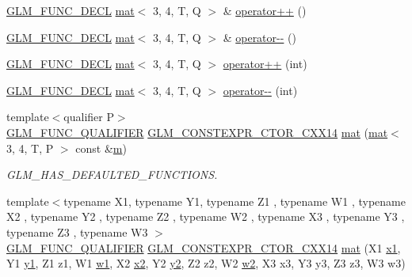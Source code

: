 \begin{DoxyCompactItemize}
\item 
\hyperlink{setup_8hpp_ab2d052de21a70539923e9bcbf6e83a51}{G\+L\+M\+\_\+\+F\+U\+N\+C\+\_\+\+D\+E\+CL} \hyperlink{structglm_1_1mat}{mat}$<$ 3, 4, T, Q $>$ \& \hyperlink{structglm_1_1mat_3_013_00_014_00_01_t_00_01_q_01_4_a03979bbfa60bbc49190ce6fd347ca6ee}{operator++} ()
\item 
\hyperlink{setup_8hpp_ab2d052de21a70539923e9bcbf6e83a51}{G\+L\+M\+\_\+\+F\+U\+N\+C\+\_\+\+D\+E\+CL} \hyperlink{structglm_1_1mat}{mat}$<$ 3, 4, T, Q $>$ \& \hyperlink{structglm_1_1mat_3_013_00_014_00_01_t_00_01_q_01_4_a127c5f4434bbd959b577ae5dfd808c10}{operator-\/-\/} ()
\item 
\hyperlink{setup_8hpp_ab2d052de21a70539923e9bcbf6e83a51}{G\+L\+M\+\_\+\+F\+U\+N\+C\+\_\+\+D\+E\+CL} \hyperlink{structglm_1_1mat}{mat}$<$ 3, 4, T, Q $>$ \hyperlink{structglm_1_1mat_3_013_00_014_00_01_t_00_01_q_01_4_ad8fc281f2fb4cd5fd107f4c4a1a04be8}{operator++} (int)
\item 
\hyperlink{setup_8hpp_ab2d052de21a70539923e9bcbf6e83a51}{G\+L\+M\+\_\+\+F\+U\+N\+C\+\_\+\+D\+E\+CL} \hyperlink{structglm_1_1mat}{mat}$<$ 3, 4, T, Q $>$ \hyperlink{structglm_1_1mat_3_013_00_014_00_01_t_00_01_q_01_4_a61b4e82bca6ca608b52da28a1ea5333a}{operator-\/-\/} (int)
\item 
{\footnotesize template$<$qualifier P$>$ }\\\hyperlink{setup_8hpp_a33fdea6f91c5f834105f7415e2a64407}{G\+L\+M\+\_\+\+F\+U\+N\+C\+\_\+\+Q\+U\+A\+L\+I\+F\+I\+ER} \hyperlink{setup_8hpp_a0900f9145e68bf6061b6f5e7be3fa751}{G\+L\+M\+\_\+\+C\+O\+N\+S\+T\+E\+X\+P\+R\+\_\+\+C\+T\+O\+R\+\_\+\+C\+X\+X14} \hyperlink{structglm_1_1mat_3_013_00_014_00_01_t_00_01_q_01_4_aa9f1719851a776d4147f74a7883cb577}{mat} (\hyperlink{structglm_1_1mat}{mat}$<$ 3, 4, T, P $>$ const \&\hyperlink{_s_d_l__opengl__glext_8h_af593500c283bf1a787a6f947f503a5c2}{m})
\begin{DoxyCompactList}\small\item\em G\+L\+M\+\_\+\+H\+A\+S\+\_\+\+D\+E\+F\+A\+U\+L\+T\+E\+D\+\_\+\+F\+U\+N\+C\+T\+I\+O\+NS. \end{DoxyCompactList}\item 
{\footnotesize template$<$typename X1, typename Y1, typename Z1 , typename W1 , typename X2 , typename Y2 , typename Z2 , typename W2 , typename X3 , typename Y3 , typename Z3 , typename W3 $>$ }\\\hyperlink{setup_8hpp_a33fdea6f91c5f834105f7415e2a64407}{G\+L\+M\+\_\+\+F\+U\+N\+C\+\_\+\+Q\+U\+A\+L\+I\+F\+I\+ER} \hyperlink{setup_8hpp_a0900f9145e68bf6061b6f5e7be3fa751}{G\+L\+M\+\_\+\+C\+O\+N\+S\+T\+E\+X\+P\+R\+\_\+\+C\+T\+O\+R\+\_\+\+C\+X\+X14} \hyperlink{structglm_1_1mat_3_013_00_014_00_01_t_00_01_q_01_4_ad1aebdb4ed006b9527f27253b13a54a7}{mat} (X1 \hyperlink{_s_d_l__opengl__glext_8h_a49825216c96caaeb09237b36651181c5}{x1}, Y1 \hyperlink{_s_d_l__opengl__glext_8h_a3af6c78fcdfccea028a5878bc747ef39}{y1}, Z1 z1, W1 \hyperlink{_s_d_l__opengl__glext_8h_ab5b747bf5adb1f9134337c30b9a4ce84}{w1}, X2 \hyperlink{_s_d_l__opengl__glext_8h_a7b907a03236685c534d89d604cff23c8}{x2}, Y2 \hyperlink{_s_d_l__opengl__glext_8h_a2be1135ed68e8d80fa9e130c7814f8c2}{y2}, Z2 z2, W2 \hyperlink{_s_d_l__opengl__glext_8h_a1ca5aca787be24213d9591fdf074b094}{w2}, X3 x3, Y3 y3, Z3 z3, W3 w3)

\end{DoxyCompactItemize}
